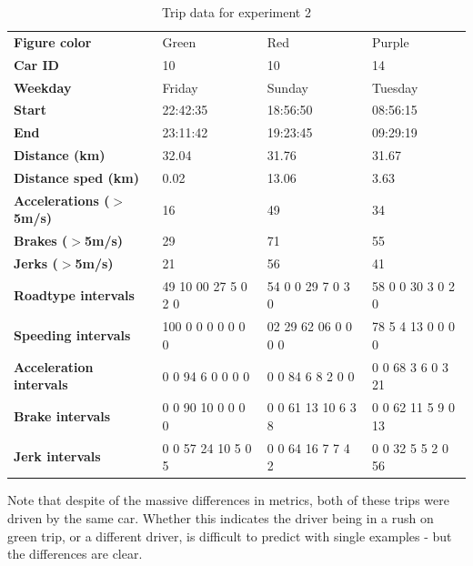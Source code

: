 \begin{table}
    \centering
    \begin{tabular}{>{\bfseries}l|lll|}
    Figure color            & Green                & Red                 & Purple             \\
    Car ID                  & 10                   & 10                  & 14                 \\
    Weekday                 & Friday               & Sunday              & Tuesday            \\
    Start                   & 22:42:35             & 18:56:50            & 08:56:15           \\
    End                     & 23:11:42             & 19:23:45            & 09:29:19           \\
    Distance (km)           & 32.04                & 31.76               & 31.67              \\
    Distance sped (km)      & 0.02                 & 13.06               & 3.63               \\
    Accelerations ($>$5m/s) & 16                   & 49                  & 34                 \\
    Brakes ($>$5m/s)        & 29                   & 71                  & 55                 \\
    Jerks ($>$5m/s)         & 21                   & 56                  & 41                 \\
    Roadtype intervals      & 49 10 00 27 5  0 2 0 & 54 0 0 29 7 0 3 0   & 58 0 0 30 3 0 2 0  \\
    Speeding intervals      & 100 0 0 0 0 0 0 0    & 02 29 62 06 0 0 0 0 & 78 5 4 13 0 0 0 0  \\
    Acceleration intervals  & 0 0 94 6 0 0 0 0     & 0 0 84 6 8 2 0 0    & 0 0 68 3 6 0 3 21  \\
    Brake intervals         & 0 0 90 10 0 0 0 0    & 0 0 61 13 10 6 3 8  & 0 0 62 11 5 9 0 13 \\
    Jerk intervals          & 0 0 57 24 10 5 0 5   & 0 0 64 16 7 7 4 2   & 0 0 32 5 5 2 0 56  \\
    \end{tabular}
    \caption{Trip data for experiment 2}
    \label{tab:longtrips}
\end{table}

Note that despite of the massive differences in metrics, both of these trips were driven by the same car. Whether this indicates the driver being in a rush on green trip, or a different driver, is difficult to predict with single examples - but the differences are clear.

